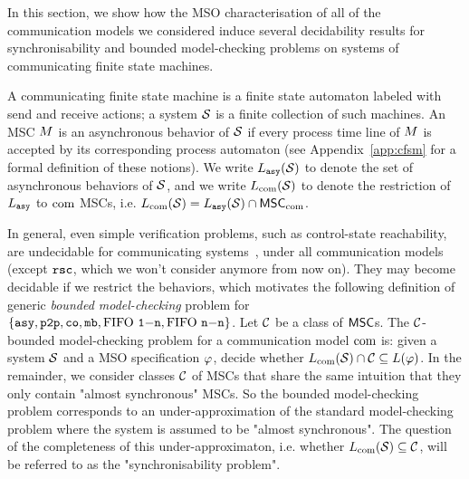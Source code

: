 

In this section, we show how the MSO characterisation of all of the communication
models we considered induce several decidability results for
synchronisability and bounded model-checking problems on systems of
communicating finite state machines.

A communicating finite state machine is a finite state automaton labeled with send
and receive actions; a system $\mathcal{S}$ is a finite collection of such machines.
An MSC $M$ is an asynchronous behavior of $\mathcal{S}$ if every process
time line of $M$ is accepted by its corresponding process automaton
\ifappendix
(see Appendix~\ref{app:cfsm} for a formal definition of these notions).
\fi
We write $L_{\mathtt{asy}}(\mathcal{S})$ to denote the set of asynchronous behaviors of $\mathcal{S}$,
and we write $L_{\textup{com}}(\mathcal{S})$ to denote the restriction of $L_{\mathtt{asy}}$ to $\textup{com}$ MSCs,
i.e. $L_{\textup{com}}(\mathcal{S})=L_{\mathtt{asy}}(\mathcal{S})\cap\mathsf{MSC}_{\textup{com}}$.

In general, even simple verification problems, such
as control-state reachability, are undecidable for
communicating systems~\cite{DBLP:journals/jacm/BrandZ83}, under all communication models (except
$\mathtt{rsc}$, which we won't consider anymore from now on).
They may become decidable if we restrict the behaviors, which motivates the following
definition of  generic \emph{bounded model-checking} problem for $\{\mathtt{asy}, \mathtt{p2p}, \mathtt{co}, \mathtt{mb}, \text{FIFO } \mathtt{1\mathsf{-}n}, \text{FIFO } \mathtt{n\mathsf{-}n} \}$. 
%
Let $\mathcal{C}$ be a class of $\mathsf{MSC}$s. The $\mathcal{C}$-bounded model-checking problem
for a communication model $\textup{com}$ is: given a system $\mathcal{S}$ and a MSO
specification $\varphi$, decide whether
$L_{\textup{com}}(\mathcal{S})\cap \mathcal{C} \subseteq L(\varphi)$.
%
In the remainder, we  consider classes $\mathcal{C}$ of MSCs that share the same intuition
that they only contain "almost synchronous" MSCs. So the bounded model-checking problem
corresponds to an under-approximation of the standard model-checking problem where the
system is assumed to be "almost synchronous". The question of the completeness of this under-approximaton, 
i.e. whether $L_{\textup{com}}(\mathcal{S})\subseteq \mathcal{C}$, will be 
referred to as the "synchronisability problem".


